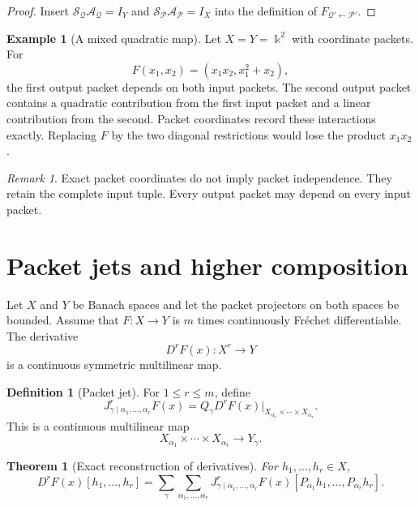 \documentclass{aomart}
\newtheorem{theorem}{Theorem}[section]
\theoremstyle{definition}
\newtheorem{definition}[definition]{Definition}
\newtheorem{example}[example]{Example}
\theoremstyle{remark}
\newtheorem{remark}[remark]{Remark}
\newcommand{\bbk}{\Bbbk}
\newcommand{\Acal}{\mathcal A}
\newcommand{\Pcal}{\mathcal P}
\newcommand{\Qcal}{\mathcal Q}
\newcommand{\Scal}{\mathcal S}
\begin{document}
\begin{proof}
Insert $\Scal_{\Qcal}\Acal_{\Qcal}=I_Y$ and $\Scal_{\Pcal}\Acal_{\Pcal}=I_X$ into the definition of $F_{\Qcal'\leftarrow\Pcal'}$.
\end{proof}

\begin{example}[A mixed quadratic map]\label{ex:mixed_quadratic}
Let $X=Y=\bbk^2$ with coordinate packets.  For
\[
F(x_1,x_2)=(x_1x_2,x_1^2+x_2),
\]
the first output packet depends on both input packets.  The second output packet contains a quadratic contribution from the first input packet and a linear contribution from the second.  Packet coordinates record these interactions exactly.  Replacing $F$ by the two diagonal restrictions would lose the product $x_1x_2$.
\end{example}

\begin{remark}\label{rem:coordinates_not_independence}
Exact packet coordinates do not imply packet independence.  They retain the complete input tuple.  Every output packet may depend on every input packet.
\end{remark}

\section{Packet jets and higher composition}\label{sec:packet_jets}

Let $X$ and $Y$ be Banach spaces and let the packet projectors on both spaces be bounded.  Assume that $F:X\to Y$ is $m$ times continuously Fr\'echet differentiable.  The derivative
\[
D^rF(x):X^r\longrightarrow Y
\]
is a continuous symmetric multilinear map.

\begin{definition}[Packet jet]\label{def:packet_jet}
For $1\le r\le m$, define
\[
J^{r}_{\gamma\mid\alpha_1,\ldots,\alpha_r}F(x)
=
Q_\gamma D^rF(x)
\big|_{X_{\alpha_1}\times\cdots\times X_{\alpha_r}}.
\]
This is a continuous multilinear map
\[
X_{\alpha_1}\times\cdots\times X_{\alpha_r}
\longrightarrow
Y_\gamma.
\]
\end{definition}

\begin{theorem}[Exact reconstruction of derivatives]\label{thm:jet_reconstruction}
For $h_1,\ldots,h_r\in X$,
\[
D^rF(x)[h_1,\ldots,h_r]
=
\sum_{\gamma}
\sum_{\alpha_1,\ldots,\alpha_r}
J^{r}_{\gamma\mid\alpha_1,\ldots,\alpha_r}F(x)
[P_{\alpha_1}h_1,\ldots,P_{\alpha_r}h_r].
\]
\end{theorem}
\end{document}
